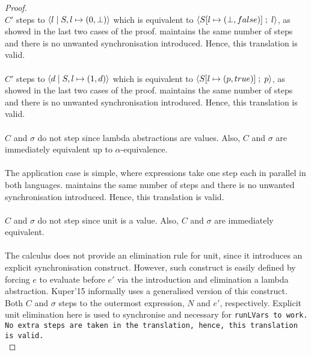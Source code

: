 \documentclass[main.tex]{subfiles}
\begin{document}
\begin{proof}
  \\
  $C'$ steps to $\langle {l}\;\vert\;{S, l \mapsto (0, \bot)} \rangle$ which
  is equivalent to $\langle {S[l \mapsto (\bot, false)]} \; ; \;{l} \rangle$, as showed in the last two
  cases of the proof. \typedlvar maintains the same number of steps and there is
  no unwanted synchronisation introduced. Hence, this translation is valid.  \\
  
  \\
  $C'$ steps to $\langle {d}\;\vert\;{S, l \mapsto (1, d)} \rangle$ which
  is equivalent to $\langle {S[l \mapsto (p, true)]} \; ; \;{p} \rangle$, as showed in the last two
  cases of the proof. \typedlvar maintains the same number of steps and there is
  no unwanted synchronisation introduced. Hence, this translation is valid. \\
  

  \\
  $C$ and $\sigma$ do not step since lambda abstractions are values. Also, $C$
  and $\sigma$ are immediately equivalent up to $\alpha$-equivalence.\\


  \\
  The application case is simple, where expressions take one step each in
  parallel in both languages. \typedlvar maintains the same number of steps and
  there is no unwanted synchronisation introduced. Hence, this translation is
  valid. \\ 


  \\
  $C$ and $\sigma$ do not step since unit is a value. Also, $C$
  and $\sigma$ are immediately equivalent.\\


  \\
  The \lvar calculus does not provide an elimination rule for unit, since it
  introduces an explicit synchronisation construct. However, such construct is
  easily defined by forcing $e$ to evaluate before $e'$ via the introduction and
  elimination a lambda abstraction. Kuper'15 informally uses a generalised
  version of this construct. Both $C$ and $\sigma$ steps to the outermost
  expression, $N$ and $e'$, respectively. Explicit unit elimination here is used
  to synchronise and necessary for \tt{runLVars} to work. No extra steps are
  taken in the translation, hence, this translation is valid.\\


\end{proof}
\end{document}
